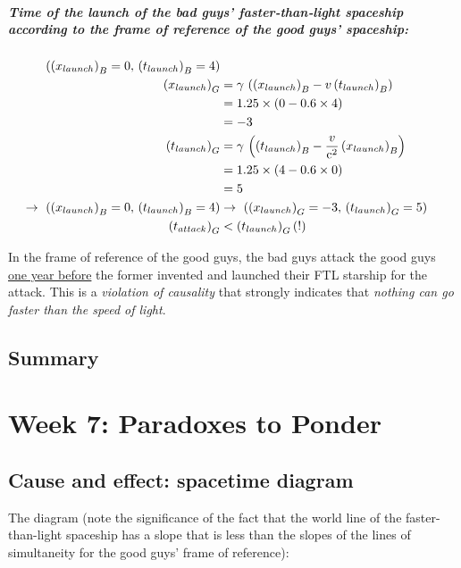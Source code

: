 \documentclass[pagesize,headsepline,10pt,parskip=half]{scrreprt}
\newcommand{\const}[1]{\ensuremath{\mathrm{#1}}}
\renewcommand{\c}{\const{c}}
\begin{document}
      \paragraph{Time of the launch of the bad guys’ faster‐than‐light spaceship
        according to the frame of reference of the good guys’ spaceship:}
        \begin{align*}
          \left({\left(x_{launch}\right)}_B = 0, \, {\left(t_{launch}\right)}_B = 4\right)\\
          {\left(x_{launch}\right)}_G
            &= \gamma \, \left({\left(x_{launch}\right)}_B - v \, {\left(t_{launch}\right)}_B\right)\\
            &= 1.25 \times \left(0 - 0.6 \times 4\right)\\
            &= -3\\
          {\left(t_{launch}\right)}_G
            &= \gamma \, \left({\left(t_{launch}\right)}_B - \frac{v}{\c^2} \, {\left(x_{launch}\right)}_B\right)\\
            &= 1.25 \times \left(4 - 0.6 \times 0\right)\\
            &= 5\\
          \rightarrow~\left({\left(x_{launch}\right)}_B = 0, \, {\left(t_{launch}\right)}_B = 4\right)
            &\rightarrow~\left({\left(x_{launch}\right)}_G = -3, \, {\left(t_{launch}\right)}_G = 5\right)\\
          {(t_{attack})}_G &< {(t_{launch})}_G \, \text(!)
        \end{align*}

        In the frame of reference of the good guys, the bad guys attack
        the good guys \underline{one year before} the former invented and
        launched their FTL starship for the attack.  This is a
        \emph{violation of causality} that strongly indicates that
        \emph{nothing can go faster than the speed of light}.

    \section{Summary}

  \chapter{Week 7: Paradoxes to Ponder}
    \section{Cause and effect: spacetime diagram}
      The diagram (note the significance of the fact that the world line of
      the faster-than-light spaceship has a slope that is less than
      the slopes of the lines of simultaneity for the good guys’
      frame of reference):
\end{document}
